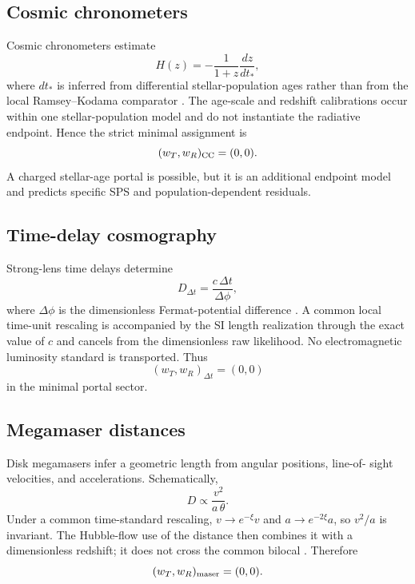 \documentclass[aps,prd,twocolumn,10pt,superscriptaddress,nofootinbib]{revtex4-2}
\begin{document}
\subsection{Cosmic chronometers}

Cosmic chronometers estimate
\begin{equation}
 H(z)=-\frac{1}{1+z}\frac{dz}{dt_*},
 \label{eq:pb_cc_estimator}
\end{equation}
where $dt_*$ is inferred from differential stellar-population ages rather
than from the local Ramsey--Kodama comparator
\cite{JimenezLoeb2002,Moresco2012}.  The age-scale and redshift calibrations
occur within one stellar-population model and do not instantiate the
radiative endpoint.  Hence the strict minimal assignment is
\begin{equation}
 (w_T,w_R)_{\rm CC}=(0,0).
 \label{eq:pb_cc_weights}
\end{equation}
A charged stellar-age portal is possible, but it is an additional endpoint
model and predicts specific SPS and population-dependent residuals.

\subsection{Time-delay cosmography}

Strong-lens time delays determine
\begin{equation}
 D_{\Delta t}=\frac{c\,\Delta t}{\Delta\phi},
 \label{eq:pb_timedelay_estimator}
\end{equation}
where $\Delta\phi$ is the dimensionless Fermat-potential difference
\cite{Birrer2024}.  A common local time-unit rescaling is accompanied by the
SI length realization through the exact value of $c$ and cancels from the
dimensionless raw likelihood.  No electromagnetic luminosity standard is
transported.  Thus
\begin{equation}
 (w_T,w_R)_{\Delta t}=(0,0)
 \label{eq:pb_timedelay_weights}
\end{equation}
in the minimal portal sector.

\subsection{Megamaser distances}

Disk megamasers infer a geometric length from angular positions, line-of-
sight velocities, and accelerations.  Schematically,
\begin{equation}
 D\propto\frac{v^2}{a\,\theta}.
 \label{eq:pb_maser_estimator}
\end{equation}
Under a common time-standard rescaling,
$v\rightarrow e^{-\xi}v$ and $a\rightarrow e^{-2\xi}a$, so $v^2/a$ is
invariant.  The Hubble-flow use of the distance then combines it with a
dimensionless redshift; it does not cross the common bilocal
\cite{Herrnstein1999,Pesce2020}.  Therefore
\begin{equation}
 (w_T,w_R)_{\rm maser}=(0,0).
 \label{eq:pb_maser_weights}
\end{equation}
\end{document}
